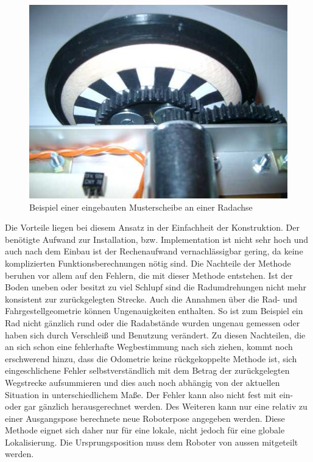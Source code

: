 \begin{figure}[h]
\center
\includegraphics[scale=0.5]{graphics/odo_einbau.jpg}
\caption{\label{fig:Odo_Einbau} Beispiel einer eingebauten Musterscheibe an einer Radachse}
\end{figure}

Die Vorteile liegen bei diesem Ansatz in der Einfachheit der Konstruktion. Der benötigte Aufwand zur Installation, bzw. Implementation ist nicht sehr hoch und auch nach dem Einbau ist der Rechenaufwand vernachlässigbar gering, da keine komplizierten Funktionsberechnungen nötig sind. Die Nachteile der Methode beruhen vor allem auf den Fehlern, die mit dieser Methode entstehen. Ist der Boden uneben oder besitzt zu viel Schlupf sind die Radumdrehungen nicht mehr konsistent zur zurückgelegten Strecke. Auch die Annahmen über die Rad- und Fahrgestellgeometrie können Ungenauigkeiten enthalten. So ist zum Beispiel ein Rad nicht gänzlich rund oder die Radabstände wurden ungenau gemessen oder haben sich durch Verschleiß und Benutzung verändert. Zu diesen Nachteilen, die an sich schon eine fehlerhafte Wegbestimmung nach sich ziehen, kommt noch erschwerend hinzu, dass die Odometrie keine rückgekoppelte Methode ist, sich eingeschlichene Fehler selbstverständlich mit dem Betrag der zurückgelegten Wegstrecke aufsummieren und dies auch noch abhängig von der aktuellen Situation in unterschiedlichem Maße. Der Fehler kann also nicht fest mit ein- oder gar gänzlich herausgerechnet werden. Des Weiteren kann nur eine relativ zu einer Ausgangspose berechnete neue Roboterpose angegeben werden. Diese Methode eignet sich daher nur für eine lokale, nicht jedoch für eine globale Lokalisierung. Die Ursprungsposition muss dem Roboter von aussen mitgeteilt werden.

